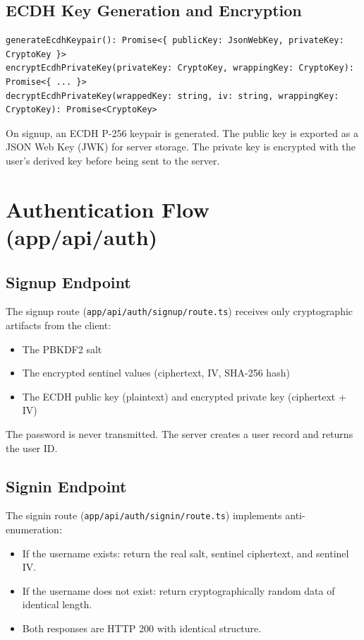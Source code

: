 \subsection{ECDH Key Generation and Encryption}

\begin{verbatim}
generateEcdhKeypair(): Promise<{ publicKey: JsonWebKey, privateKey: CryptoKey }>
encryptEcdhPrivateKey(privateKey: CryptoKey, wrappingKey: CryptoKey): Promise<{ ... }>
decryptEcdhPrivateKey(wrappedKey: string, iv: string, wrappingKey: CryptoKey): Promise<CryptoKey>
\end{verbatim}

On signup, an ECDH P-256 keypair is generated. The public key is exported as a JSON Web Key (JWK) for server storage. The private key is encrypted with the user's derived key before being sent to the server.

\section{Authentication Flow (app/api/auth)}

\subsection{Signup Endpoint}

The signup route (\texttt{app/api/auth/signup/route.ts}) receives only cryptographic artifacts from the client:
\begin{itemize}
    \item The PBKDF2 salt
    \item The encrypted sentinel values (ciphertext, IV, SHA-256 hash)
    \item The ECDH public key (plaintext) and encrypted private key (ciphertext + IV)
\end{itemize}

The password is never transmitted. The server creates a user record and returns the user ID.

\subsection{Signin Endpoint}

The signin route (\texttt{app/api/auth/signin/route.ts}) implements anti-enumeration:
\begin{itemize}
    \item If the username exists: return the real salt, sentinel ciphertext, and sentinel IV.
    \item If the username does not exist: return cryptographically random data of identical length.
    \item Both responses are HTTP 200 with identical structure.
\end{itemize}

